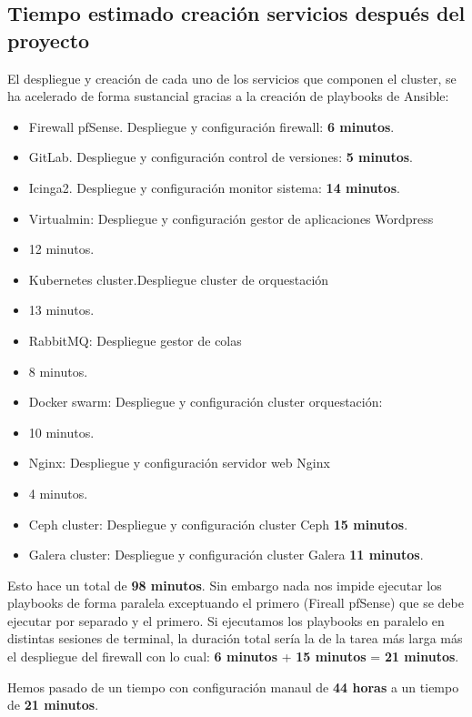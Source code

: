 \subsection{Tiempo estimado creación servicios después del proyecto}
\begin{text}
        El despliegue y creación de cada uno de los servicios que componen el cluster, se ha acelerado de forma sustancial gracias a la creación de playbooks de Ansible:
        \begin{itemize}
                \item Firewall pfSense. Despliegue y configuración firewall: \textbf{6 minutos}.
                \item GitLab. Despliegue y configuración control de versiones: \textbf{5 minutos}.
                \item Icinga2. Despliegue y configuración monitor sistema: \textbf{14 minutos}.
                \item Virtualmin: Despliegue y configuración gestor de aplicaciones Wordpress \item{12 minutos}.
                \item Kubernetes cluster.Despliegue cluster de orquestación \item{13 minutos}.
                \item RabbitMQ: Despliegue gestor de colas \item{8 minutos}.
                \item Docker swarm: Despliegue y configuración cluster orquestación: \item{10 minutos}.
                \item Nginx: Despliegue y configuración servidor web Nginx \item{4 minutos}.
                \item Ceph cluster: Despliegue y configuración cluster Ceph \textbf{15 minutos}.
                \item Galera cluster: Despliegue y configuración cluster Galera \textbf{11 minutos}.
        \end{itemize}

        Esto hace un total de \textbf{98 minutos}. Sin embargo nada nos impide ejecutar los playbooks de forma paralela exceptuando el primero (Fireall pfSense) que se debe ejecutar por separado y el primero. Si ejecutamos los playbooks en paralelo en distintas sesiones de terminal, la duración total sería la de la tarea más larga más el despliegue del firewall con lo cual: \textbf{6 minutos} + \textbf{15 minutos} = \textbf{21 minutos}.

        Hemos pasado de un tiempo con configuración manaul de \textbf{44 horas} a un tiempo de \textbf{21 minutos}.
\end{text}
